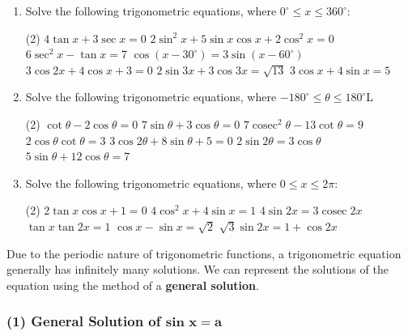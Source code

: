 \documentclass{report}
\begin{document}
\begin{enumerate}
	\item Solve the following trigonometric equations, where $0^{\circ} \leq x \leq 360^{\circ}$:
	      \begin{tasks}[label=(\alph*)](2)
	      	\task $4 \tan x+3 \sec x=0$
	      	\task $2 \sin ^2 x+5 \sin x \cos x+2 \cos ^2 x=0$
	      	\task $6 \sec ^2 x-\tan x=7$
	      	\task $\cos \left(x-30^{\circ}\right)=3 \sin \left(x-60^{\circ}\right)$
	      	\task $3 \cos 2 x+4 \cos x+3=0$
	      	\task $2 \sin 3 x+3 \cos 3 x=\sqrt{13}$
	      	\task $3 \cos x+4 \sin x=5$
	      \end{tasks}
	\item Solve the following trigonometric equations, where $-180^{\circ} \leq \theta \leq 180^{\circ}$L
	      \begin{tasks}[label=(\alph*)](2)
	      	\task $\cot \theta-2 \cos \theta=0$
	      	\task $7 \sin \theta+3 \cos \theta=0$
	      	\task $7 \operatorname{cosec}^2 \theta-13 \cot \theta=9$
	      	\task $2 \cos \theta \cot \theta=3$
	      	\task $3 \cos 2 \theta+8 \sin \theta+5=0$
	      	\task $2 \sin 2 \theta=3 \cos \theta$
	      	\task $5 \sin \theta+12 \cos \theta=7$
	      \end{tasks}
	\item Solve the following trigonometric equations, where $0 \leq x \leq 2 \pi$:
	      \begin{tasks}[label=(\alph*)](2)
	      	\task $2 \tan x \cos x+1=0$
	      	\task $4 \cos ^2 x+4 \sin x=1$
	      	\task $4 \sin 2 x=3 \operatorname{cosec} 2 x$
	      	\task $\tan x \tan 2 x=1$
	      	\task $\cos x-\sin x=\sqrt{2}$
	      	\task $\sqrt{3} \sin 2 x=1+\cos 2 x$
	      \end{tasks}
\end{enumerate}

Due to the periodic nature of trigonometric functions, a trigonometric equation generally has infinitely many solutions. We can represent the solutions of the equation using the method of a \textbf{general solution}.

\subsubsection*{(1) General Solution of $\mathbf{\text{sin } x=a}$}
\end{document}
